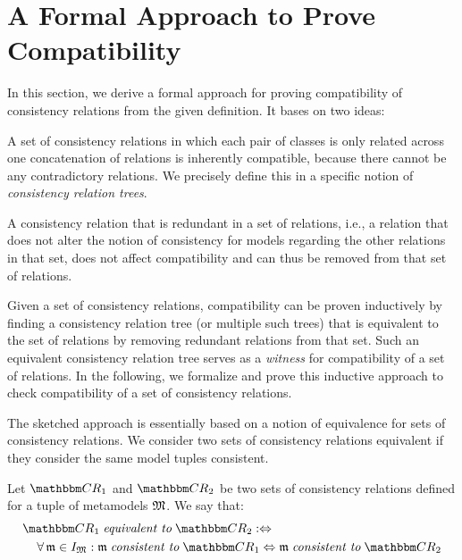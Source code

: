 \section{A Formal Approach to Prove Compatibility}
\label{chap:compatibility:formal_approach}

In this section, we derive a formal approach for proving compatibility of consistency relations from the given definition.
It bases on two ideas:
\begin{longenumerate}
    \item A set of consistency relations in which each pair of classes is only related across one concatenation of relations is inherently compatible, because there cannot be any contradictory relations. We precisely define this in a specific notion of \emph{consistency relation trees}.
    \item A consistency relation that is redundant in a set of relations, i.e., a relation that does not alter the notion of consistency for models regarding the other relations in that set, does not affect compatibility and can thus be removed from that set of relations.
\end{longenumerate}
Given a set of consistency relations, compatibility can be proven inductively by finding a consistency relation tree (or multiple such trees) that is equivalent to the set of relations by removing redundant relations from that set.
Such an equivalent consistency relation tree serves as a \emph{witness} for compatibility of a set of relations.
In the following, we formalize and prove this inductive approach to check compatibility of a set of consistency relations.

The sketched approach is essentially based on a notion of equivalence for sets of consistency relations.
We consider two sets of consistency relations equivalent if they consider the same model tuples consistent.

\begin{definition}
\label{def:equivalence}
    Let $\consistencyrelationset{CR}_{1}$ and $\consistencyrelationset{CR}_{2}$ be two sets of consistency relations defined for a tuple of metamodels $\metamodeltuple{M}$.
    We say that:
    \begin{align*}
        &
        \consistencyrelationset{CR}_{1} \equivalenttomath \consistencyrelationset{CR}_{2} \equivalentperdefinition \\
        & \formulaskip
        \forall \modeltuple{m} \in \metamodeltupleinstanceset{M} : \modeltuple{m} \consistenttomath \consistencyrelationset{CR}_{1} \equivalent \modeltuple{m} \consistenttomath \consistencyrelationset{CR}_{2}
    \end{align*}
\end{definition}

